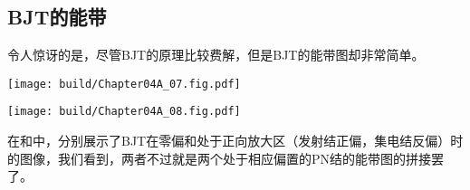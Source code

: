 \subsection{BJT的能带}
令人惊讶的是，尽管BJT的原理比较费解，但是BJT的能带图却非常简单。

\begin{Figure}[BJT的能带]
    \begin{FigureSub}[截止区]
        \texttt{[image: build/Chapter04A\_07.fig.pdf]}
    \end{FigureSub}
    \begin{FigureSub}[放大区]
        \texttt{[image: build/Chapter04A\_08.fig.pdf]}
    \end{FigureSub}
\end{Figure}

在和中，分别展示了BJT在零偏和处于正向放大区（发射结正偏，集电结反偏）时的图像，我们看到，两者不过就是两个处于相应偏置的PN结的能带图的拼接罢了。

